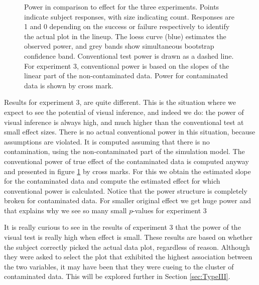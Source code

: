 \documentclass{article}
\begin{document}
\begin{figure}[hbtp]
   \centering
       \caption{Power in comparison to effect for the three experiments. Points indicate subject responses, with size indicating count. Responses are 1 and 0 depending on the success or failure respectively to identify the actual plot in the lineup. The loess curve (blue) estimates the observed power, and grey bands show simultaneous bootstrap confidence band.  Conventional test power is drawn as a dashed line. For experiment 3, conventional power is based on the slopes of the linear part of the non-contaminated data. Power for contaminated data is shown by cross mark.}
       \label{fig:power_loess_effect}
\end{figure}

Results for experiment 3, are quite different. This is the situation where we expect to see the potential of visual inference, and indeed we do: the power of visual inference is always high, and much higher than the conventional test at small effect sizes. There is no actual conventional power in this situation, because assumptions are violated. It is computed assuming that there is no contamination, using the non-contaminated part of the simulation model. The  conventional power of true effect of the contaminated data is computed anyway and presented in figure \ref{fig:power_loess_effect} by cross marks. For this we obtain the estimated slope for the contaminated data and compute the estimated effect for which conventional power is calculated. Notice that the power structure is completely broken for contaminated data. For smaller original effect we get huge power and that explains why we see so many small $p$-values for experiment 3

It is really curious to see in the results of experiment 3 that the power of the visual test is really high when effect is small. These results are based on whether the subject correctly picked the actual data plot, regardless of reason. Although they were asked to select the plot that exhibited the highest association between the two variables, it may have been that they were cueing to the cluster of contaminated data. This will be explored further in Section \ref{sec:TypeIII}. 
\end{document}
